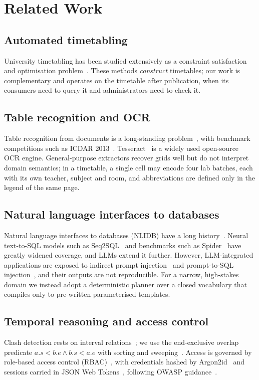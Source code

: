 \documentclass[conference]{IEEEtran}
\begin{document}
\section{Related Work}
\subsection{Automated timetabling}
University timetabling has been studied extensively as a constraint satisfaction and optimisation
problem~\cite{schaerf1999,burke2002,lewis2008}. These methods \emph{construct} timetables; our work is
complementary and operates on the timetable after publication, when its consumers need to query it and
administrators need to check it.

\subsection{Table recognition and OCR}
Table recognition from documents is a long-standing problem~\cite{zanibbi2004,kieninger1998}, with
benchmark competitions such as ICDAR 2013~\cite{gobel2013}. Tesseract~\cite{smith2007} is a widely used
open-source OCR engine. General-purpose extractors recover grids well but do not interpret domain
semantics; in a timetable, a single cell may encode four lab batches, each with its own teacher, subject
and room, and abbreviations are defined only in the legend of the same page.

\subsection{Natural language interfaces to databases}
Natural language interfaces to databases (NLIDB) have a long history~\cite{androutsopoulos1995}. Neural
text-to-SQL models such as Seq2SQL~\cite{zhong2017} and benchmarks such as Spider~\cite{yu2018} have
greatly widened coverage, and LLMs extend it further. However, LLM-integrated applications are exposed
to indirect prompt injection~\cite{greshake2023} and prompt-to-SQL injection~\cite{pedro2023}, and their
outputs are not reproducible. For a narrow, high-stakes domain we instead adopt a deterministic planner
over a closed vocabulary that compiles only to pre-written parameterised templates.

\subsection{Temporal reasoning and access control}
Clash detection rests on interval relations~\cite{allen1983}; we use the end-exclusive overlap
predicate $a.s < b.e \wedge b.s < a.e$ with sorting and sweeping~\cite{cormen2009}. Access is governed by
role-based access control (RBAC)~\cite{sandhu1996}, with credentials hashed by Argon2id~\cite{biryukov2016}
and sessions carried in JSON Web Tokens~\cite{rfc7519}, following OWASP guidance~\cite{owasp2021}.
\end{document}
